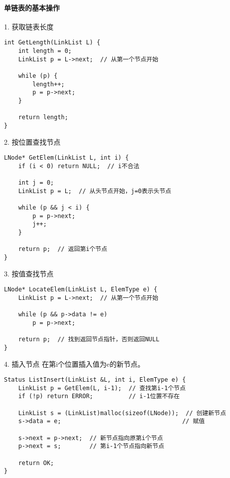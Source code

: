 \documentclass{../../note}
\begin{document}
\paragraph{单链表的基本操作}

1. 获取链表长度
\begin{verbatim}
int GetLength(LinkList L) {
    int length = 0;
    LinkList p = L->next;  // 从第一个节点开始

    while (p) {
        length++;
        p = p->next;
    }

    return length;
}
\end{verbatim}

2. 按位置查找节点
\begin{verbatim}
LNode* GetElem(LinkList L, int i) {
    if (i < 0) return NULL;  // i不合法

    int j = 0;
    LinkList p = L;  // 从头节点开始，j=0表示头节点

    while (p && j < i) {
        p = p->next;
        j++;
    }

    return p;  // 返回第i个节点
}
\end{verbatim}

3. 按值查找节点
\begin{verbatim}
LNode* LocateElem(LinkList L, ElemType e) {
    LinkList p = L->next;  // 从第一个节点开始

    while (p && p->data != e)
        p = p->next;

    return p;  // 找到返回节点指针，否则返回NULL
}
\end{verbatim}

4. 插入节点
在第i个位置插入值为e的新节点。

\begin{verbatim}
Status ListInsert(LinkList &L, int i, ElemType e) {
    LinkList p = GetElem(L, i-1);  // 查找第i-1个节点
    if (!p) return ERROR;          // i-1位置不存在

    LinkList s = (LinkList)malloc(sizeof(LNode));  // 创建新节点
    s->data = e;                                  // 赋值

    s->next = p->next;  // 新节点指向原第i个节点
    p->next = s;        // 第i-1个节点指向新节点

    return OK;
}
\end{verbatim}
\end{document}
